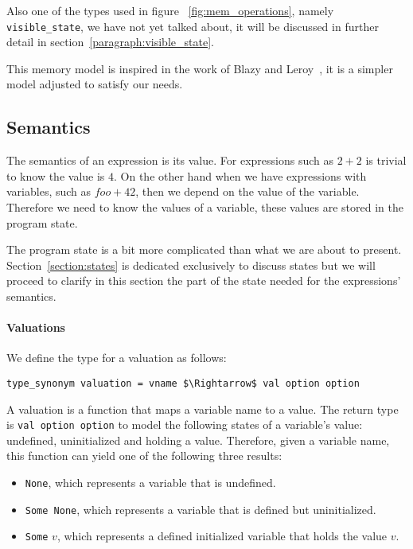 Also one of the types used in figure ~\ref{fig:mem_operations}, namely \verb|visible_state|, we have not yet talked about, it will be discussed in further detail in section~\ref{paragraph:visible_state}.

This memory model is inspired in the work of Blazy and Leroy~\parencite{compcert}, it is a simpler model adjusted to satisfy our needs.


\subsection{Semantics}\label{subsection:semantics_expressions}

The semantics of an expression is its value.
For expressions such as $2 + 2$ is trivial to know the value is $4$.
On the other hand when we have expressions with variables, such as $foo + 42$, then we depend on the value of the variable.
Therefore we need to know the values of a variable, these values are stored in the program state.

The program state is a bit more complicated than what we are about to present.
Section~\ref{section:states} is dedicated exclusively to discuss states but we will proceed to clarify in this section the part of the state needed for the expressions' semantics.

\paragraph{Valuations}\label{paragraph:valuation}

We define the type for a valuation as follows:

\begin{lstlisting}[frame=single, mathescape=true]
type_synonym valuation = vname $\Rightarrow$ val option option
\end{lstlisting}

A valuation is a function that maps a variable name to a value.
The return type is \verb|val option option| to model the following states of a variable's value: undefined, uninitialized and holding a value.
Therefore, given a variable name, this function can yield one of the following three results:

\begin{itemize}
  \item{\verb|None|, which represents a variable that is undefined.}
  \item{\verb|Some None|, which represents a variable that is defined but uninitialized.}
  \item{\verb|Some| $v$, which represents a defined initialized variable that holds the value $v$.}
\end{itemize}

